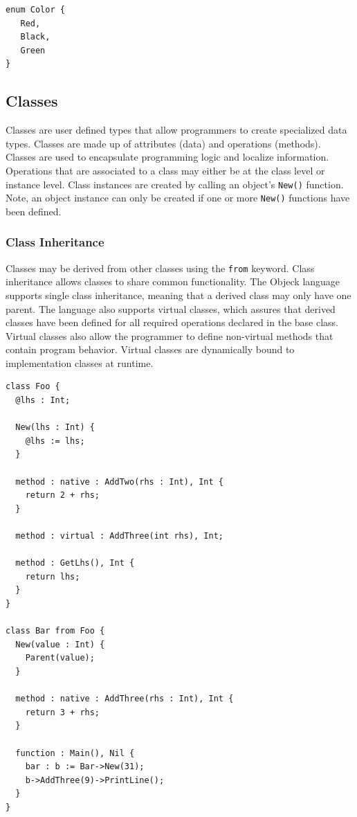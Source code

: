 \documentclass[12pt]{article}
\begin{document}
\begin{verbatim}
enum Color {
   Red,
   Black,
   Green
}
\end{verbatim}

\subsection{Classes}
Classes are user defined types that allow programmers to create specialized data types.  Classes are made up of attributes (data) and operations (methods).  Classes are used to encapsulate programming logic and localize information.  Operations that are associated to a class may either be at the class level or instance level.  Class instances are created by calling an object's \texttt{New()} function.  Note, an object instance can only be created if one or more \texttt{New()} functions have been defined.

\subsubsection{Class Inheritance}
Classes may be derived from other classes using the \texttt{from} keyword.  Class inheritance allows classes to share common functionality.  The Objeck language supports single class inheritance, meaning that a derived class may only have one parent.  The language also supports virtual classes, which assures that derived classes have been defined for all required operations declared in the base class.  Virtual classes also allow the programmer to define non-virtual methods that contain program behavior.  Virtual classes are dynamically bound to implementation classes at runtime.
\begin{verbatim}
class Foo {
  @lhs : Int;

  New(lhs : Int) {
    @lhs := lhs;
  }

  method : native : AddTwo(rhs : Int), Int {
    return 2 + rhs;
  }

  method : virtual : AddThree(int rhs), Int;

  method : GetLhs(), Int {
    return lhs;
  }
}

class Bar from Foo {
  New(value : Int) {
    Parent(value);
  }

  method : native : AddThree(rhs : Int), Int {
    return 3 + rhs;
  }

  function : Main(), Nil {
    bar : b := Bar->New(31);
    b->AddThree(9)->PrintLine();
  }
}
\end{verbatim}
\end{document}
